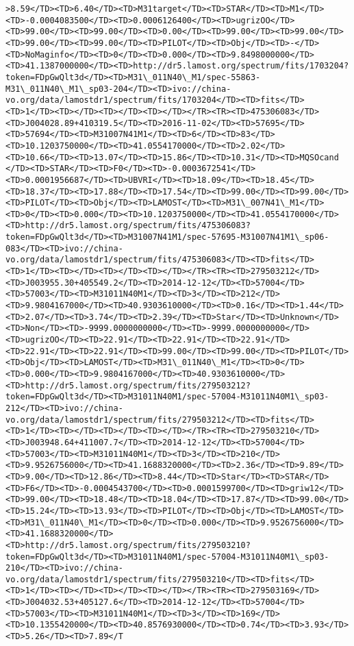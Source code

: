 \documentclass[11pt]{article}
\begin{document}
\begin{Verbatim}[commandchars=\\\{\}]
>8.59</TD><TD>6.40</TD><TD>M31target</TD><TD>STAR</TD><TD>M1</TD><TD>-0.0004083500</TD><TD>0.0006126400</TD><TD>ugrizOO</TD><TD>99.00</TD><TD>99.00</TD><TD>0.00</TD><TD>99.00</TD><TD>99.00</TD><TD>99.00</TD><TD>99.00</TD><TD>PILOT</TD><TD>Obj</TD><TD>-</TD><TD>NoMaginfo</TD><TD>0</TD><TD>0.000</TD><TD>9.8498000000</TD><TD>41.1387000000</TD><TD>http://dr5.lamost.org/spectrum/fits/1703204?token=FDpGwQlt3d</TD><TD>M31\_011N40\_M1/spec-55863-M31\_011N40\_M1\_sp03-204</TD><TD>ivo://china-vo.org/data/lamostdr1/spectrum/fits/1703204</TD><TD>fits</TD><TD>1</TD><TD></TD><TD></TD><TD></TD></TR><TR><TD>475306083</TD><TD>J004028.89+410319.5</TD><TD>2016-11-02</TD><TD>57695</TD><TD>57694</TD><TD>M31007N41M1</TD><TD>6</TD><TD>83</TD><TD>10.1203750000</TD><TD>41.0554170000</TD><TD>2.02</TD><TD>10.66</TD><TD>13.07</TD><TD>15.86</TD><TD>10.31</TD><TD>MQSOcand  </TD><TD>STAR</TD><TD>F0</TD><TD>-0.0003672541</TD><TD>0.0001956687</TD><TD>UBVRI</TD><TD>18.09</TD><TD>18.45</TD><TD>18.37</TD><TD>17.88</TD><TD>17.54</TD><TD>99.00</TD><TD>99.00</TD><TD>PILOT</TD><TD>Obj</TD><TD>LAMOST</TD><TD>M31\_007N41\_M1</TD><TD>0</TD><TD>0.000</TD><TD>10.1203750000</TD><TD>41.0554170000</TD><TD>http://dr5.lamost.org/spectrum/fits/475306083?token=FDpGwQlt3d</TD><TD>M31007N41M1/spec-57695-M31007N41M1\_sp06-083</TD><TD>ivo://china-vo.org/data/lamostdr1/spectrum/fits/475306083</TD><TD>fits</TD><TD>1</TD><TD></TD><TD></TD><TD></TD></TR><TR><TD>279503212</TD><TD>J003955.30+405549.2</TD><TD>2014-12-12</TD><TD>57004</TD><TD>57003</TD><TD>M31011N40M1</TD><TD>3</TD><TD>212</TD><TD>9.9804167000</TD><TD>40.9303610000</TD><TD>0.16</TD><TD>1.44</TD><TD>2.07</TD><TD>3.74</TD><TD>2.39</TD><TD>Star</TD><TD>Unknown</TD><TD>Non</TD><TD>-9999.0000000000</TD><TD>-9999.0000000000</TD><TD>ugrizOO</TD><TD>22.91</TD><TD>22.91</TD><TD>22.91</TD><TD>22.91</TD><TD>22.91</TD><TD>99.00</TD><TD>99.00</TD><TD>PILOT</TD><TD>Obj</TD><TD>LAMOST</TD><TD>M31\_011N40\_M1</TD><TD>0</TD><TD>0.000</TD><TD>9.9804167000</TD><TD>40.9303610000</TD><TD>http://dr5.lamost.org/spectrum/fits/279503212?token=FDpGwQlt3d</TD><TD>M31011N40M1/spec-57004-M31011N40M1\_sp03-212</TD><TD>ivo://china-vo.org/data/lamostdr1/spectrum/fits/279503212</TD><TD>fits</TD><TD>1</TD><TD></TD><TD></TD><TD></TD></TR><TR><TD>279503210</TD><TD>J003948.64+411007.7</TD><TD>2014-12-12</TD><TD>57004</TD><TD>57003</TD><TD>M31011N40M1</TD><TD>3</TD><TD>210</TD><TD>9.9526756000</TD><TD>41.1688320000</TD><TD>2.36</TD><TD>9.89</TD><TD>9.00</TD><TD>12.86</TD><TD>8.44</TD><TD>Star</TD><TD>STAR</TD><TD>F6</TD><TD>-0.0004543700</TD><TD>0.0001599700</TD><TD>griw12</TD><TD>99.00</TD><TD>18.48</TD><TD>18.04</TD><TD>17.87</TD><TD>99.00</TD><TD>15.24</TD><TD>13.93</TD><TD>PILOT</TD><TD>Obj</TD><TD>LAMOST</TD><TD>M31\_011N40\_M1</TD><TD>0</TD><TD>0.000</TD><TD>9.9526756000</TD><TD>41.1688320000</TD><TD>http://dr5.lamost.org/spectrum/fits/279503210?token=FDpGwQlt3d</TD><TD>M31011N40M1/spec-57004-M31011N40M1\_sp03-210</TD><TD>ivo://china-vo.org/data/lamostdr1/spectrum/fits/279503210</TD><TD>fits</TD><TD>1</TD><TD></TD><TD></TD><TD></TD></TR><TR><TD>279503169</TD><TD>J004032.53+405127.6</TD><TD>2014-12-12</TD><TD>57004</TD><TD>57003</TD><TD>M31011N40M1</TD><TD>3</TD><TD>169</TD><TD>10.1355420000</TD><TD>40.8576930000</TD><TD>0.74</TD><TD>3.93</TD><TD>5.26</TD><TD>7.89</T
\end{Verbatim}
\end{document}
